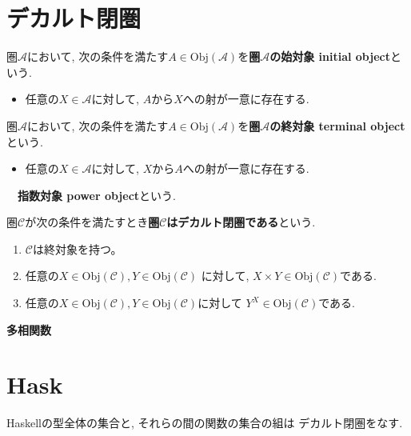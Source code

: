 \section{デカルト閉圏}
\begin{Def}
圏$\mathscr{A}$において, 次の条件を満たす$A\in\mathrm{Obj}(\mathscr{A})$を{\bf 圏$\mathscr{A}$の始対象 initial object}という.
\begin{itemize}
\item 任意の$X\in\mathscr{A}$に対して, $A$から$X$への射が一意に存在する.
\end{itemize}
\end{Def}
\begin{Def}
圏$\mathscr{A}$において, 次の条件を満たす$A\in\mathrm{Obj}(\mathscr{A})$を{\bf 圏$\mathscr{A}$の終対象 terminal object}という.
\begin{itemize}
\item 任意の$X\in\mathscr{A}$に対して, $X$から$A$への射が一意に存在する.
\end{itemize}
\end{Def}
\begin{Def}
{\bf　指数対象 power object}という.
\end{Def}
\begin{Notation}
\end{Notation}
\begin{Def}
圏$\mathscr{C}$が次の条件を満たすとき{\bf 圏$\mathscr{C}$はデカルト閉圏である}という.
\begin{enumerate}
\item
$\mathscr{C}$は終対象を持つ。
\item
任意の$X\in\mathrm{Obj}(\mathscr{C}),Y\in\mathrm{Obj}(\mathscr{C})$ に対して,
$X\times Y\in\mathrm{Obj}(\mathscr{C})$である.
\item
任意の$X\in\mathrm{Obj}(\mathscr{C}),Y\in\mathrm{Obj}(\mathscr{C})$に対して
$Y^X\in\mathrm{Obj}(\mathscr{C})$である.
\end{enumerate}
\end{Def}
\begin{Def}
{\bf 多相関数}
\end{Def}

\section{Hask}

\begin{Prop}
Haskellの型全体の集合と,
それらの間の関数の集合の組は
デカルト閉圏をなす.
\end{Prop}

